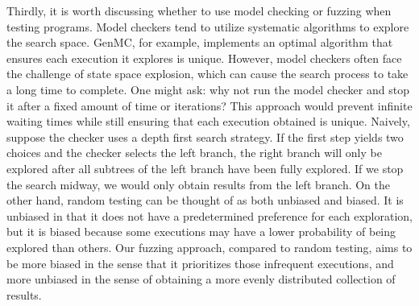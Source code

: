 Thirdly, it is worth discussing whether to use model checking or fuzzing when testing programs. Model checkers tend to utilize systematic algorithms to explore the search space. GenMC, for example, implements an optimal algorithm that ensures each execution it explores is unique. However, model checkers often face the challenge of state space explosion, which can cause the search process to take a long time to complete. One might ask: why not run the model checker and stop it after a fixed amount of time or iterations? This approach would prevent infinite waiting times while still ensuring that each execution obtained is unique.
Naively, suppose the checker uses a depth first search strategy. If the first step yields two choices and the checker selects the left branch, the right branch will only be explored after all subtrees of the left branch have been fully explored. If we stop the search midway, we would only obtain results from the left branch. On the other hand, random testing can be thought of as both unbiased and biased. It is unbiased in that it does not have a predetermined preference for each exploration, but it is biased because some executions may have a lower probability of being explored than others. Our fuzzing approach, compared to random testing, aims to be more biased in the sense that it prioritizes those infrequent executions, and more unbiased in the sense of obtaining a more evenly distributed collection of results.



